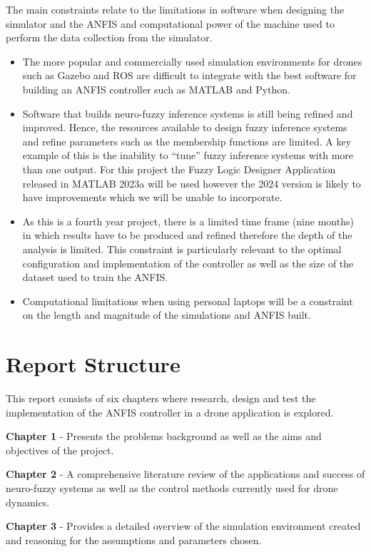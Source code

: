 The main constraints relate to the limitations in software when designing the simulator and the ANFIS and computational power of the machine used to perform the data collection from the simulator. 
\begin{itemize}
  \item The more popular and commercially used simulation environments for drones such as Gazebo and ROS are difficult to integrate with the best software for building an ANFIS controller such as MATLAB and Python.
  \item Software that builds neuro-fuzzy inference systems is still being refined and improved. Hence, the resources available to design fuzzy inference systems and refine parameters such as the membership functions are limited. A key example of this is the inability to ``tune'' fuzzy inference systems with more than one output. For this project the Fuzzy Logic Designer Application released in MATLAB 2023a will be used however the 2024 version is likely to have improvements which we will be unable to incorporate.  
  \item As this is a fourth year project, there is a limited time frame (nine months) in which results have to be produced and refined therefore the depth of the analysis is limited. This constraint is particularly relevant to the optimal configuration and implementation of the controller as well as the size of the dataset used to train the ANFIS.
  \item Computational limitations when using personal laptops will be a constraint on the length and magnitude of the simulations and ANFIS built.  
  \end{itemize}
\section{Report Structure}
This report consists of six chapters where research, design and test the implementation of the ANFIS controller in a drone application is explored. 

\textbf{Chapter 1} - Presents the problems background as well as the aims and objectives of the project.

\textbf{Chapter 2} - A comprehensive literature review of the applications and success of neuro-fuzzy systems as well as the control methods currently used for drone dynamics. 

\textbf{Chapter 3} - Provides a detailed overview of the simulation environment created and reasoning for the assumptions and parameters chosen. 

